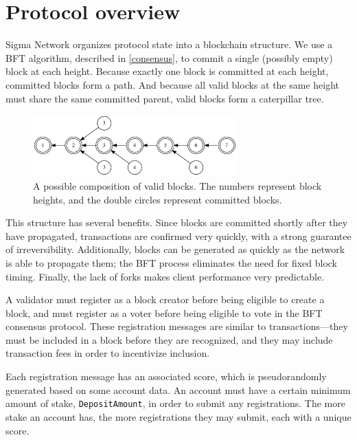 \section{Protocol overview}
\label{protocol}

Sigma Network organizes protocol state into a blockchain structure. We use a BFT algorithm, described in \autoref{consensus}, to commit a single (possibly empty) block at each height. Because exactly one block is committed at each height, committed blocks form a path. And because all valid blocks at the same height must share the same committed parent, valid blocks form a caterpillar tree.

\begin{figure}[h]
  \centering
    \includegraphics[width=0.7\textwidth]{images/chain-structure}
  \caption{A possible composition of valid blocks. The numbers represent block heights, and the double circles represent committed blocks.}
\end{figure}

This structure has several benefits. Since blocks are committed shortly after they have propagated, transactions are confirmed very quickly, with a strong guarantee of irreversibility. Additionally, blocks can be generated as quickly as the network is able to propagate them; the BFT process eliminates the need for fixed block timing. Finally, the lack of forks makes client performance very predictable.


A validator must register as a block creator before being eligible to create a block, and must register as a voter before being eligible to vote in the BFT consensus protocol. These registration messages are similar to transactions---they must be included in a block before they are recognized, and they may include transaction fees in order to incentivize inclusion.

Each registration message has an associated score, which is pseudorandomly generated based on some account data. An account must have a certain minimum amount of stake, \texttt{DepositAmount}, in order to submit any registrations. The more stake an account has, the more registrations they may submit, each with a unique score.

